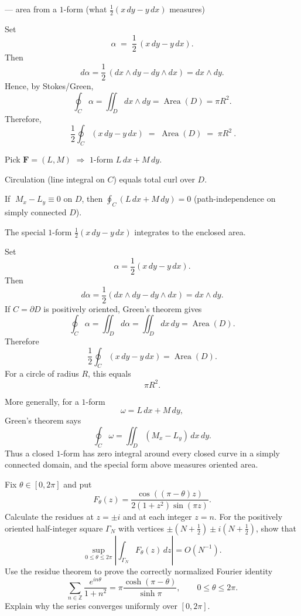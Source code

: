 \begin{problem}[CP-IV-0048]
\label{prob:cp-iv-0048}
— area from a $1$-form (what $\tfrac12(x\,dy-y\,dx)$ measures)

Set
\[
\alpha \;=\; \frac12\,(x\,dy - y\,dx).
\]
Then
\[
d\alpha
=
\frac12\,(dx\wedge dy - dy\wedge dx)
=
dx\wedge dy.
\]
Hence, by Stokes/Green,
\[
\oint_{C} \alpha
=
\iint_{D} dx\wedge dy
=
\operatorname{Area}(D)
=
\pi R^2.
\]
Therefore,
\[
\boxed{\ \frac12 \oint_{C} (x\,dy - y\,dx)\;=\;\operatorname{Area}(D)\;=\;\pi R^2\ }.
\]

	\par\noindent\textbullet\quad Pick $\mathbf F=(L,M)$ $\Rightarrow$ $1$-form $L\,dx+M\,dy$.
	\par\noindent\textbullet\quad Circulation (line integral on $C$) equals total curl over $D$.
	\par\noindent\textbullet\quad If $\;M_x-L_y\equiv 0$ on $D$, then $\displaystyle \oint_{C}(L\,dx+M\,dy)=0$ (path-independence on simply connected $D$).
	\par\noindent\textbullet\quad The special $1$-form $\tfrac12(x\,dy - y\,dx)$ integrates to the enclosed area.
\end{problem}

\begin{solution}
Set
\[
\alpha=\frac12(x\,dy-y\,dx).
\]
Then
\[
d\alpha
=
\frac12(dx\wedge dy-dy\wedge dx)
=
dx\wedge dy.
\]
If \(C=\partial D\) is positively oriented, Green's theorem gives
\[
\oint_C\alpha
=
\iint_D d\alpha
=
\iint_D dx\,dy
=
\operatorname{Area}(D).
\]
Therefore
\[
\boxed{
\frac12\oint_C(x\,dy-y\,dx)=\operatorname{Area}(D).
}
\]
For a circle of radius \(R\), this equals
\[
\pi R^2.
\]

More generally, for a \(1\)-form
\[
\omega=L\,dx+M\,dy,
\]
Green's theorem says
\[
\oint_C\omega
=
\iint_D(M_x-L_y)\,dx\,dy.
\]
Thus a closed \(1\)-form has zero integral around every closed curve in a simply connected domain, and the special form above measures oriented area.
\end{solution}


\begin{problem}[CP-IV-0053]
\label{prob:cp-iv-0053}
Fix \(\theta\in[0,2\pi]\) and put
\[
F_\theta(z)=\frac{\cos((\pi-\theta)z)}{2(1+z^2)\sin(\pi z)}.
\]
Calculate the residues at \(z=\pm i\) and at each integer \(z=n\).
For the positively oriented half-integer square \(\Gamma_N\) with vertices
\(\pm(N+\frac12)\pm i(N+\frac12)\), show that
\[
\sup_{0\le\theta\le2\pi}
\left|\int_{\Gamma_N}F_\theta(z)\,dz\right|=O(N^{-1}).
\]
Use the residue theorem to prove the correctly normalized Fourier identity
\[
\sum_{n\in\mathbb Z}\frac{e^{in\theta}}{1+n^2}
=\pi\frac{\cosh(\pi-\theta)}{\sinh\pi},
\qquad 0\le\theta\le2\pi.
\]
Explain why the series converges uniformly over \([0,2\pi]\).
\end{problem}

